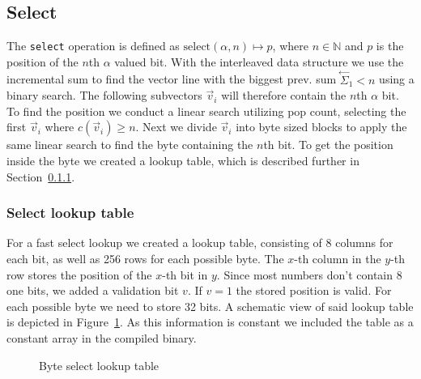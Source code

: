 \documentclass[a4paper,UKenglish,cleveref, autoref, thm-restate]{lipics-v2021}
\def\code#1{\texttt{#1}}
\newcommand\prevsum[0]{\ensuremath{\overset{\leftarrow}{\Sigma}_1}}
\begin{document}
\subsection{Select}
The \code{select} operation is defined as $\text{select}(\alpha, n) \mapsto p$, where $n \in \mathbb{N}$ and $p$ is the position
of the $n$th $\alpha$ valued bit. With the interleaved data structure we use the incremental sum
to find the vector line with the biggest prev. sum $\prevsum < n$ using a binary search.
The following subvectors $\vec{v}_i$ will therefore contain the $n$th $\alpha$ bit.
To find the position we conduct a linear search utilizing pop count, selecting the first
$\vec{v}_i$ where $c(\vec{v}_i) \geq n$. Next we divide $\vec{v}_i$ into byte sized blocks to apply 
the same linear search to find the byte containing the $n$th bit.
To get the position inside the byte we created a lookup table, which is described further in Section~\ref{p:select_lookup}.

\subsubsection{Select lookup table}
\label{p:select_lookup}
For a fast select lookup we created a lookup table, consisting of 8 columns for each bit,
as well as 256 rows for each possible byte.
The $x$-th column in the $y$-th row stores the position of the $x$-th bit in $y$.
Since most numbers don't contain 8 one bits, we added a validation bit $v$.
If $v = 1$ the stored position is valid. For each possible byte we need to store 32 bits.
A schematic view of said lookup table is depicted in Figure~\ref{fig:select_lookup}.
As this information is constant we included the table as a constant array in the compiled binary.

\begin{figure}[htbp]
    \centering
    \caption{Byte select lookup table}
    \label{fig:select_lookup}
\end{figure}
\end{document}

